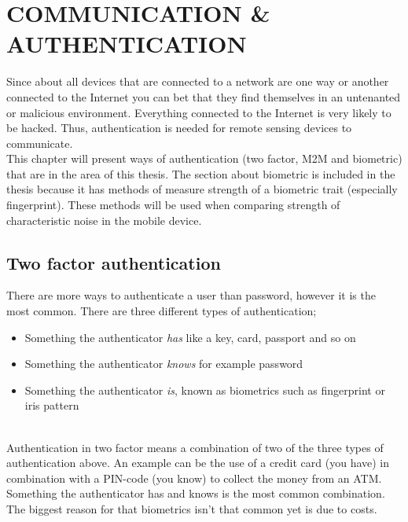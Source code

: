 \chapter{COMMUNICATION \& AUTHENTICATION}\label{cha:auth} 
Since about all devices that are connected to a network are one way or another connected to the Internet you can bet that they find themselves in an untenanted or malicious environment. Everything connected to the Internet is very likely to be hacked. Thus, authentication is needed for remote sensing devices to communicate. \cite[]{auth:M2Mcom}\\
This chapter will present ways of authentication (two factor, M2M and biometric) that are in the area of this thesis. The section about biometric is included in the thesis because it has methods of measure strength of a biometric trait (especially fingerprint). These methods will be used when comparing strength of characteristic noise in the mobile device. \\


\section{Two factor authentication}\label{sec:2fauth} 
There are more ways to authenticate a user than password, however it is the most common. There are three different types of authentication; 
\begin{itemize}
	\item Something the authenticator \textit{has} like a key, card, passport and so on
	\item Something the authenticator \textit{knows} for example password
	\item Something the authenticator \textit{is}, known as biometrics such as fingerprint or iris pattern
\end{itemize}
\cite[p.~31]{rosssec} \\
Authentication in two factor means a combination of two of the three types of authentication above. An example can be the use of a credit card (you have) in combination with a PIN-code (you know) to collect the money from an ATM. Something the authenticator has and knows is the most common combination. The biggest reason for that biometrics isn't that common yet is due to costs.
\cite[p.~47]{rosssec}

